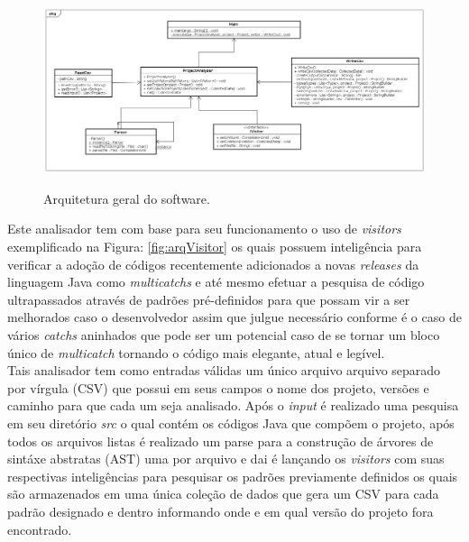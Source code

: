 \begin{figure}[h]
	\center
	\includegraphics[width=1.0\textwidth]{Imagens/Arquitetura}
	\label{fig:arqGeral}
	\caption{Arquitetura geral do software.}
\end{figure}

Este analisador tem com base para seu funcionamento o uso de {\it visitors} \cite{Gamma:1995:DPE:186897} exemplificado na Figura: \ref{fig:arqVisitor} os quais possuem inteligência para verificar a adoção de códigos recentemente adicionados a novas {\it releases} da linguagem Java como {\it multicatchs} e até mesmo efetuar a pesquisa de código ultrapassados através de padrões pré-definidos para que possam vir a ser melhorados caso o desenvolvedor assim que julgue necessário conforme é o caso de vários {\it catchs} aninhados que pode ser um potencial caso de se tornar um bloco único de {\it multicatch} tornando o código mais elegante, atual e legível.\\

Tais analisador tem como entradas válidas um único arquivo arquivo separado por vírgula (CSV) que possui em seus campos o nome dos projeto, versões e caminho para que cada um seja analisado. Após o {\it input} é realizado uma pesquisa em seu diretório \textit{src} o qual contém os códigos Java que compõem o projeto, após todos os arquivos listas é realizado um parse para a construção de árvores de sintáxe abstratas (AST) uma por arquivo e dai é lançando os {\it visitors}  \cite{Gamma:1995:DPE:186897} com suas respectivas inteligências para pesquisar os padrões previamente definidos os quais são armazenados em uma única coleção de dados que gera um CSV para cada padrão designado e dentro informando onde e em qual versão do projeto fora encontrado.\\
	
\clearpage

